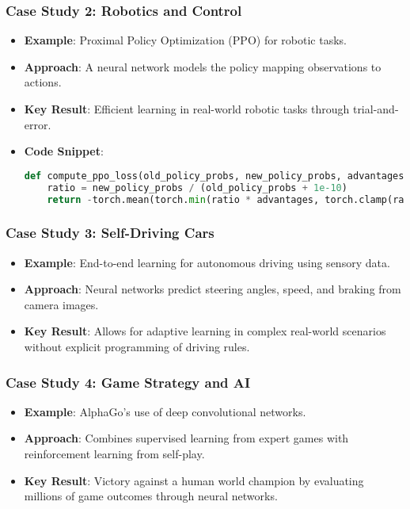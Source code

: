 \documentclass[aspectratio=169]{beamer}
\begin{document}
\begin{frame}
    \frametitle{Case Study 2: Robotics and Control}
    \begin{itemize}
        \item \textbf{Example}: Proximal Policy Optimization (PPO) for robotic tasks.
        \item \textbf{Approach}: A neural network models the policy mapping observations to actions.
        \item \textbf{Key Result}: Efficient learning in real-world robotic tasks through trial-and-error.
        \item \textbf{Code Snippet}:
        \begin{lstlisting}[language=Python]
def compute_ppo_loss(old_policy_probs, new_policy_probs, advantages):
    ratio = new_policy_probs / (old_policy_probs + 1e-10)
    return -torch.mean(torch.min(ratio * advantages, torch.clamp(ratio, 1 - epsilon, 1 + epsilon) * advantages))
        \end{lstlisting}
    \end{itemize}
\end{frame}

\begin{frame}
    \frametitle{Case Study 3: Self-Driving Cars}
    \begin{itemize}
        \item \textbf{Example}: End-to-end learning for autonomous driving using sensory data.
        \item \textbf{Approach}: Neural networks predict steering angles, speed, and braking from camera images.
        \item \textbf{Key Result}: Allows for adaptive learning in complex real-world scenarios without explicit programming of driving rules.
    \end{itemize}
\end{frame}

\begin{frame}
    \frametitle{Case Study 4: Game Strategy and AI}
    \begin{itemize}
        \item \textbf{Example}: AlphaGo's use of deep convolutional networks.
        \item \textbf{Approach}: Combines supervised learning from expert games with reinforcement learning from self-play.
        \item \textbf{Key Result}: Victory against a human world champion by evaluating millions of game outcomes through neural networks.
    \end{itemize}
\end{frame}
\end{document}
